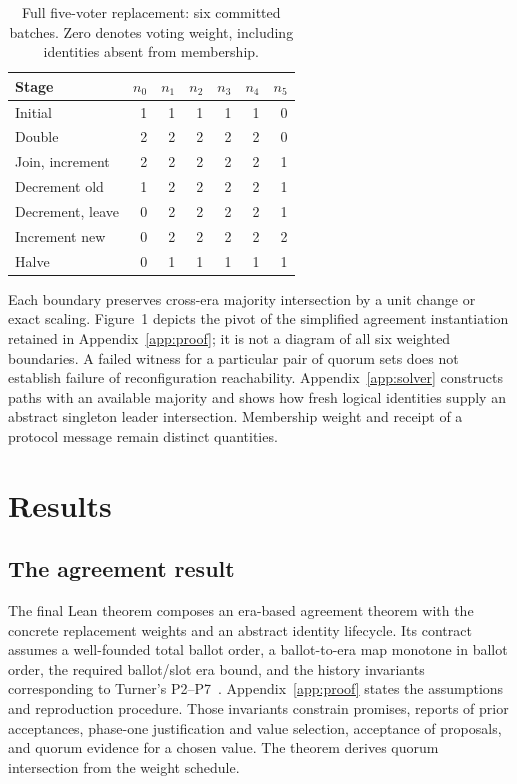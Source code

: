 \documentclass[10pt,journal,letterpaper]{IEEEtran}
\begin{document}
\begin{table}[t]
\centering
\caption{Full five-voter replacement: six committed batches. Zero denotes voting weight, including identities absent from membership.}
\label{tab:weights}
\small
\begin{tabular}{lrrrrrr}
\toprule
Stage & $n_0$ & $n_1$ & $n_2$ & $n_3$ & $n_4$ & $n_5$\\
\midrule
Initial & 1&1&1&1&1&0\\
Double & 2&2&2&2&2&0\\
Join, increment & 2&2&2&2&2&1\\
Decrement old & 1&2&2&2&2&1\\
Decrement, leave & 0&2&2&2&2&1\\
Increment new & 0&2&2&2&2&2\\
Halve & 0&1&1&1&1&1\\
\bottomrule
\end{tabular}
\end{table}

Each boundary preserves cross-era majority intersection by a unit change or exact scaling. Figure~1 depicts the pivot of the simplified agreement instantiation retained in Appendix~\ref{app:proof}; it is not a diagram of all six weighted boundaries. A failed witness for a particular pair of quorum sets does not establish failure of reconfiguration reachability. Appendix~\ref{app:solver} constructs paths with an available majority and shows how fresh logical identities supply an abstract singleton leader intersection. Membership weight and receipt of a protocol message remain distinct quantities.

\section{Results}\label{sec:results}
\subsection{The agreement result}
The final Lean theorem composes an era-based agreement theorem with the concrete replacement weights and an abstract identity lifecycle. Its contract assumes a well-founded total ballot order, a ballot-to-era map monotone in ballot order, the required ballot/slot era bound, and the history invariants corresponding to Turner's P2--P7~\cite{turner}. Appendix~\ref{app:proof} states the assumptions and reproduction procedure. Those invariants constrain promises, reports of prior acceptances, phase-one justification and value selection, acceptance of proposals, and quorum evidence for a chosen value. The theorem derives quorum intersection from the weight schedule.
\end{document}
